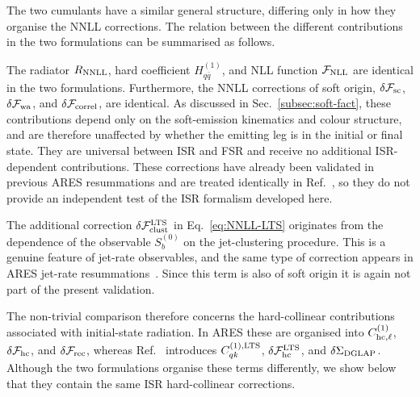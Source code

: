 The two cumulants have a similar general structure, differing only in how they organise the NNLL corrections.
The relation between the different contributions in the two formulations can be summarised as follows.

The radiator $R_{\rm NNLL}$, hard coefficient $H^{(1)}_{q\bar{q}}$,
and NLL function $\mathcal{F}_{\rm NLL}$ are identical in the two
formulations. Furthermore, the NNLL corrections of soft origin,
$\delta\mathcal{F}_{\rm sc}$, $\delta\mathcal{F}_{\rm wa}$, and
$\delta\mathcal{F}_{\rm correl}$, are identical. As discussed in
Sec.~\ref{subsec:soft-fact}, these contributions depend only on the
soft-emission kinematics and colour structure, and are therefore
unaffected by whether the emitting leg is in the initial or final
state. They are universal between ISR and FSR and receive no additional
ISR-dependent contributions. These corrections have already been
validated in previous \textsc{ARES} resummations and are treated
identically in Ref.~\cite{vanBeekveld:2025zjh}, so they do not provide
an independent test of the ISR formalism developed here.

The additional correction $\delta\mathcal{F}^{\rm LTS}_{\rm clust}$ in
Eq.~\eqref{eq:NNLL-LTS} originates from the dependence of the observable
$S_b^{(0)}$ on the jet-clustering procedure. This is a genuine feature
of jet-rate observables, and the same type of correction appears in
\textsc{ARES} jet-rate resummations~\cite{Banfi:2016zlc}. Since this
term is also of soft origin it is again not part of the present validation.

The non-trivial comparison therefore concerns the hard-collinear
contributions associated with initial-state radiation. In \textsc{ARES}
these are organised into $C_{{\rm hc},\ell}^{(1)}$,
$\delta\mathcal{F}_{\rm hc}$, and $\delta\mathcal{F}_{\rm rec}$,
whereas Ref.~\cite{vanBeekveld:2025zjh} introduces
$C_{qk}^{(1),\rm LTS}$, $\delta\mathcal{F}^{\rm LTS}_{\rm hc}$, and
$\delta\Sigma_{\rm DGLAP}$. Although the two formulations organise
these terms differently, we show below that they contain the same ISR
hard-collinear corrections.

